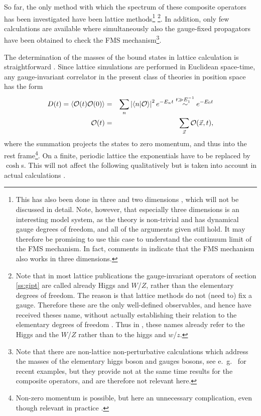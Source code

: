 \documentclass[final,12pt]{article}
\newcommand*{\no}{\noindent}
\newcommand*{\bea}{\begin{eqnarray}}
\newcommand*{\eea}{\end{eqnarray}}
\newcommand*{\nn}{\nonumber}
\newcommand*{\1}{1\!\!\!\bot}
\newcommand*{\la}{\left\langle}
\newcommand*{\ra}{\right\rangle}
\newcommand*{\op}{{\cal O}}
\begin{document}
So far, the only method with which the spectrum of these composite operators has been investigated have been lattice methods\footnote{This has also been done in three \cite{Karsch:1996aw,Philipsen:1996af,Philipsen:1997rq,Laine:1997nq,Capri:2012cr} and two dimensions \cite{Gongyo:2014jfa}, which will not be discussed in detail. Note, however, that especially three dimensions is an interesting model system, as the theory is non-trivial and has dynamical gauge degrees of freedom, and all of the arguments given still hold. It may therefore be promising to use this case to understand the continuum limit of the FMS mechanism. In fact, comments in \cite{Karsch:1996aw} indicate that the FMS mechanism also works in three dimensions.} \cite{Wurtz:2013ova,Maas:2013aia,Maas:2014pba,Maas:2012tj,Evertz:1986vp,Evertz:1985fc,Langguth:1985eu,Langguth:1985dr,Kuti:1987nr}\footnote{Note that in most lattice publications the gauge-invariant operators of section \ref{ss:gipt} are called already Higgs and $W$/$Z$, rather than the elementary degrees of freedom. The reason is that lattice methods do not (need to) fix a gauge. Therefore these are the only well-defined observables, and  hence have received theses name, without actually establishing their relation to the elementary degrees of freedom \cite{Lang:pc,Wittig:pc}. Thus in \cite{Wurtz:2013ova,Evertz:1986vp,Evertz:1985fc,Langguth:1985eu,Langguth:1985dr,Kuti:1987nr,Philipsen:1996af}, these names already refer to the Higgs and the $W$/$Z$ rather than to the higgs and $w$/$z$.}. In addition, only few calculations are available where simultaneously also the gauge-fixed propagators have been obtained \cite{Maas:2013aia,Maas:2012tj,Maas:2010nc} to check the FMS mechanism\footnote{Note that there are non-lattice non-perturbative calculations which address the masses of the elementary higgs boson and gauges bosons, see e.\ g.\ \cite{Benes:2008ir,Fister:2010yw,Capri:2013oja,Gies:2015lia} for recent examples, but they provide not at the same time results for the composite operators, and are therefore not relevant here.}.

The determination of the masses of the bound states in lattice calculation is straightforward \cite{Montvay:1994cy,Gattringer:2010zz}. Since lattice simulations are performed in Euclidean space-time, any gauge-invariant correlator in the present class of theories in position space has the form \cite{Seiler:1982pw,Frohlich:1981yi}
\bea
D(t)=\la\op(t)\op(0)\ra&=&\sum_n\left|\la n|\op\ra\right|^2e^{-E_n t}\stackrel{t\gg E_1^{-1}}{\sim}e^{-E_0 t}\label{lelevels}\\
\op(t)&=&\sum_{\vec x}\op(\vec x,t)\nn,
\eea
\no where the summation projects the states to zero momentum, and thus into the rest frame\footnote{Non-zero momentum is possible, but here an unnecessary complication, even though relevant in practice \cite{Gattringer:2010zz,Wurtz:2013ova}.}. On a finite, periodic lattice the exponentials have to be replaced by $\cosh$s. This will not affect the following qualitatively but is taken into account in actual calculations \cite{Montvay:1994cy,Gattringer:2010zz}.
\end{document}
